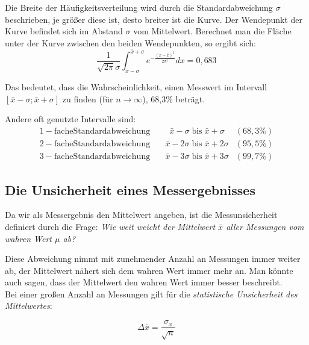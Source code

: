 Die Breite der Häufigkeitsverteilung wird durch die Standardabweichung $\sigma$ beschrieben, je größer diese ist, desto breiter ist die Kurve. Der Wendepunkt der Kurve befindet sich im Abstand $\sigma$ vom Mittelwert. Berechnet man die Fläche unter der Kurve zwischen den beiden Wendepunkten, so ergibt sich:
\begin{equation}
	\frac{1}{\sqrt{2\pi}\sigma}\int_{\bar{x}-\sigma}^{\bar{x}+\sigma}{e^{-\frac{\left(x-\bar{x}\right)^2}{2\sigma^2}}dx} = 0,683
\end{equation}

Das bedeutet, dass die Wahrscheinlichkeit, einen Messwert im Intervall $\left[\bar{x}-\sigma; \bar{x}+\sigma\right]$ zu finden (für $n\rightarrow\infty$), 68,3\% beträgt.

\noindent
Andere oft genutzte Intervalle sind:
\begin{align*}
	\mathrm{1-fache Standardabweichung} &\quad \phantom{0}\bar{x}-\sigma \; \mathrm{bis}\; \bar{x}+\sigma & (68,3\%)\\
	\mathrm{2-fache Standardabweichung} &\quad \bar{x}-2\sigma\; \mathrm{bis}\; \bar{x}+2\sigma & (95,5\%)\\
	\mathrm{3-fache Standardabweichung} &\quad \bar{x}-3\sigma\; \mathrm{bis}\; \bar{x}+3\sigma & (99,7\%)
\end{align*}
\subsection{Die Unsicherheit eines Messergebnisses}

Da wir als Messergebnis den Mittelwert angeben, ist die Messunsicherheit definiert durch die Frage: \textit{Wie weit weicht der Mittelwert $\bar{x}$ aller Messungen vom wahren Wert $\mu$ ab?}

Diese Abweichung nimmt mit zunehmender Anzahl an Messungen immer weiter ab, der Mittelwert nähert sich dem wahren Wert immer mehr an. Man könnte auch sagen, dass der Mittelwert den wahren Wert immer besser beschreibt.\\
Bei einer großen Anzahl an Messungen gilt für die \textit{statistische Unsicherheit des Mittelwertes}:
\begin{hint}
	\begin{equation}
		\Delta{\bar{x}} = \frac{\sigma_x}{\sqrt{n}}
	\end{equation}
\end{hint}

